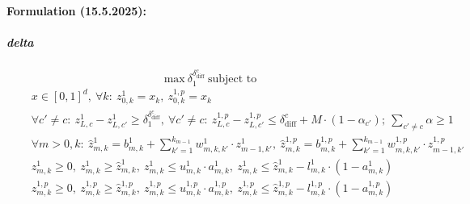 \documentclass[11pt]{article}
\begin{document}
\paragraph{Formulation (15.5.2025):}
\subparagraph{delta}
$$ \text{max}\ \delta_{1}^{\delta_{\text{diff}}^{c}}\ \text{subject to} $$
\begin{align*}
\tag{a}\quad & x\in{[0,1]^d},\ \forall{k}:\ z_{0,k}^1=x_k,\ {z_{0,k}^{1,p}}=x_k\\
\tag{b}\quad & \forall{c'\ne{c}}:\ {z_{L,c}^1}-{z_{L,c'}^1}\geq\delta_{1}^{\delta_{\text{diff}}^{c}},\   \forall{c'\ne{c}}:\ {z_{L,c}^{1,p}}-{z_{L,c'}^{1,p}}\leq{\delta_{\text{diff}}^c+M\cdot{(1-\alpha_{c'})}};\ \sum_{c'\ne{c}}{\alpha}\geq{1}\\
\tag{c}\quad &  \forall{m>0,k}:\ \hat{z}_{m,k}^1=b_{m,k}^1+\sum_{k'=1}^{k_{m-1}}{w_{m,k,k'}^1\cdot{z_{m-1,k'}^1}},\ \hat{z}_{m,k}^{1,p}=b_{m,k}^{1,p}+\sum_{k'=1}^{k_{m-1}}{w_{m,k,k'}^{1,p}\cdot{z_{m-1,k'}^{1,p}}}  \\
\tag{d}\quad & z_{m,k}^{1}\geq{0},\ z_{m,k}^{1}\geq{\hat{z}_{m,k}^{1}},\ z_{m,k}^{1}\leq{u_{m,k}^{1}\cdot{a_{m,k}^{1}}},\ z_{m,k}^{1}\leq{\hat{z}_{m,k}^{1}-l_{m,k}^{1}\cdot{(1-a_{m,k}^{1})}}\\ 
\quad & z_{m,k}^{1,p}\geq{0},\ z_{m,k}^{1,p}\geq{\hat{z}_{m,k}^{1,p}},\ z_{m,k}^{1,p}\leq{u_{m,k}^{1,p}\cdot{a_{m,k}^{1,p}}},\ z_{m,k}^{1,p}\leq{\hat{z}_{m,k}^{1,p}-l_{m,k}^{1,p}\cdot{(1-a_{m,k}^{1,p})}} 
    \\
\end{align*}
\end{document}
